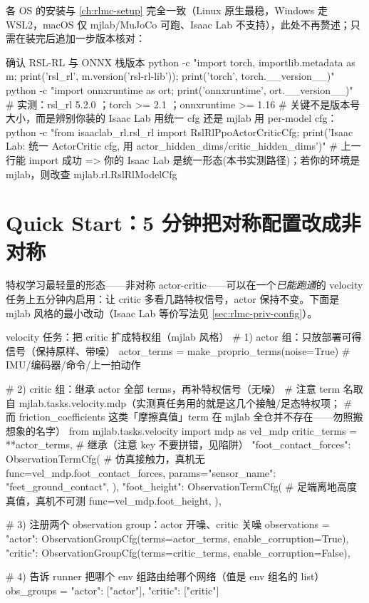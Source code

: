 各 OS 的安装与 \cref{ch:rlmc-setup} 完全一致（Linux 原生最稳，Windows 走 WSL2，macOS 仅 mjlab/MuJoCo 可跑、Isaac Lab 不支持），此处不再赘述；只需在装完后追加一步版本核对：

\begin{codebox}[bash]{确认 RSL-RL 与 ONNX 栈版本}
python -c "import torch, importlib.metadata as m; print('rsl_rl', m.version('rsl-rl-lib')); print('torch', torch.__version__)"
python -c "import onnxruntime as ort; print('onnxruntime', ort.__version__)"
# 实测：rsl_rl 5.2.0 ；torch >= 2.1 ；onnxruntime >= 1.16
# 关键不是版本号大小，而是辨别你装的 Isaac Lab 用统一 cfg 还是 mjlab 用 per-model cfg：
python -c "from isaaclab_rl.rsl_rl import RslRlPpoActorCriticCfg; print('Isaac Lab: 统一 ActorCritic cfg, 用 actor_hidden_dims/critic_hidden_dims')"
# 上一行能 import 成功 => 你的 Isaac Lab 是统一形态(本书实测路径)；若你的环境是 mjlab，则改查 mjlab.rl.RslRlModelCfg
\end{codebox}

\section*{Quick Start：5 分钟把对称配置改成非对称}
\label{sec:rlmc-priv-quickstart}

特权学习最轻量的形态——非对称 actor-critic——可以在一个\emph{已能跑通}的 velocity 任务上五分钟内启用：让 critic 多看几路特权信号，actor 保持不变。下面是 mjlab 风格的最小改动（Isaac Lab 等价写法见 \cref{sec:rlmc-priv-config}）。

\begin{codebox}[Python]{velocity 任务：把 critic 扩成特权组（mjlab 风格）}
# 1) actor 组：只放部署可得信号（保持原样、带噪）
actor_terms = make_proprio_terms(noise=True)   # IMU/编码器/命令/上一拍动作

# 2) critic 组：继承 actor 全部 terms，再补特权信号（无噪）
# 注意 term 名取自 mjlab.tasks.velocity.mdp（实测真任务用的就是这几个接触/足态特权项；
# 而 friction_coefficients 这类「摩擦真值」term 在 mjlab 全仓并不存在——勿照搬想象的名字）
from mjlab.tasks.velocity import mdp as vel_mdp
critic_terms = {
    **actor_terms,                              # 继承（注意 key 不要拼错，见陷阱）
    "foot_contact_forces": ObservationTermCfg(  # 仿真接触力，真机无
        func=vel_mdp.foot_contact_forces,
        params={"sensor_name": "feet_ground_contact"},
    ),
    "foot_height": ObservationTermCfg(          # 足端离地高度真值，真机不可测
        func=vel_mdp.foot_height,
    ),
}

# 3) 注册两个 observation group：actor 开噪、critic 关噪
observations = {
    "actor":  ObservationGroupCfg(terms=actor_terms,  enable_corruption=True),
    "critic": ObservationGroupCfg(terms=critic_terms, enable_corruption=False),
}

# 4) 告诉 runner 把哪个 env 组路由给哪个网络（值是 env 组名的 list）
obs_groups = {"actor": ["actor"], "critic": ["critic"]}
\end{codebox}

